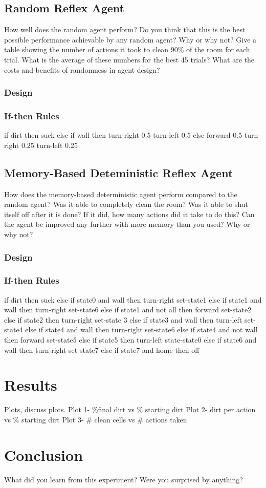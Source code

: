 \documentclass[a4paper,10pt]{article}
\begin{document}
\subsection{Random Reflex Agent}
How well does the random agent perform? Do you think that this is the best possible performance achievable by any random agent? Why or why not? Give a table showing the number of actions it took to clean 90\% of the room for each trial. What is the average of these numbers for the best 45 trials? What are the costs and benefits of randomness in agent design?
\subsubsection{Design}
\subsubsection{If-then Rules}
if dirt then suck
else if wall then turn-right 0.5 turn-left 0.5
else forward 0.5 turn-right 0.25 turn-left 0.25


\subsection{Memory-Based Deteministic Reflex Agent}
How does the memory-based deterministic agent perform compared to the random agent? Was it able to completely clean the room? Was it able to shut itself off after it is done? If it did, how many actions did it take to do this? Can the agent be improved any further with more memory than you used? Why or why not?
\subsubsection{Design}
\subsubsection{If-then Rules}
if dirt then suck
else if state0 and wall then turn-right set-state1
else if state1 and wall then turn-right set-state6
else if state1 and not all then forward set-state2
else if state2 then turn-right set-state 3
else if state3 and wall then turn-left set-state4
else if state4 and wall then turn-right set-state6
else if state4 and not wall then forward set-state5
else if state5 then turn-left state-state0
else if state6 and wall then turn-right set-state7
else if state7 and home then off


\section{Results}
Plots, discuss plots.
Plot 1- \%final dirt vs \% starting dirt
Plot 2- dirt per action vs \% starting dirt
Plot 3- \# clean cells vs \# actions taken

\section{Conclusion}
What did you learn from this experiment? Were you surprised by anything?
\end{document}
